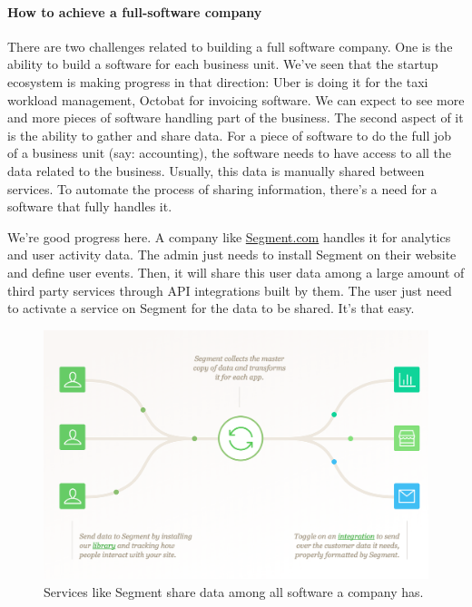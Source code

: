 \documentclass[12pt]{article}
\begin{document}
\smallskip

\paragraph{How to achieve a full-software company}

There are two challenges related to building a full software company. One is the
ability to build a software for each business unit. We've seen that the startup
ecosystem is making progress in that direction: Uber is doing it for the taxi
workload management, Octobat for invoicing software. We can expect to see more
and more pieces of software handling part of the business. The second aspect of
it is the ability to gather and share data. For a piece of software to do the
full job of a business unit (say: accounting), the software needs to have access
to all the data related to the business. Usually, this data is manually shared
between services. To automate the process of sharing information, there's a need
for a software that fully handles it.

We're good progress here. A company like
\href{https://segment.com/}{Segment.com} handles it for analytics and user
activity data. The admin just needs to install Segment on their website and
define user events. Then, it will share this user data among a large amount of
third party services through API integrations built by them. The user just need
to activate a service on Segment for the data to be shared. It's that easy.

\smallskip

\begin{figure}[h]
    \centering
    \includegraphics[scale=0.5]{segment}
    \caption{Services like Segment share data among all software a company has.}
    \label{fig:segment}
\end{figure}
\end{document}
